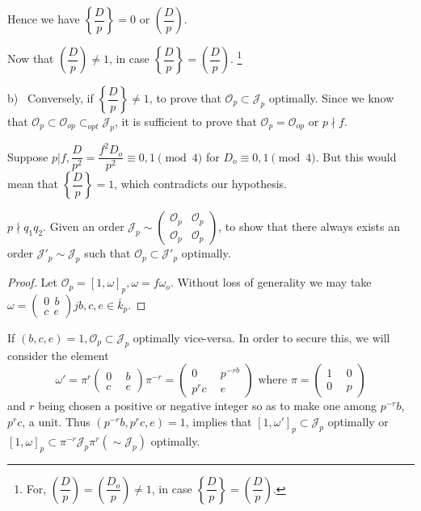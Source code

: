 Hence we have $\left\{\dfrac{D}{p}\right\} = 0$ or
$\left(\dfrac{D}{p}\right)$. 

Now that $\left(\dfrac{D}{p}\right) \neq 1$, in case
$\left\{\dfrac{D}{p}\right\} = \left(\dfrac{D}{p}\right)$. \footnote{For,
  $\left(\dfrac{D}{p}\right) = \left(\dfrac{D_o}{p}\right) \neq 1$, in case
  $\left\{\dfrac{D}{p}\right\} = \left(\dfrac{D}{p}\right)$.} 

b)~ Conversely, if $\left\{\dfrac{D}{p}\right\} \neq 1$, to prove that
$\mathscr{O}_p \subset \mathcal{J}_p$ optimally. Since we know that
$\mathscr{O}_p \subset \mathscr{O}_{op} \subset_{opt} \mathcal{J}_p$, it
is sufficient to prove that $\mathscr{O}_p = \mathscr{O}_{op}$ or $p
\nmid f$. 

Suppose $p | f, \dfrac{D}{p^2} = \dfrac{f^2 D_o}{p^2} \equiv 0, 1
\pmod 4$ for $D_o \equiv 0, 1 \pmod 4$. But this would mean that
$\left\{\dfrac{D}{p}\right\} = 1$, which contradicts our hypothesis. 

\begin{case}[(ii) ]\label{chap4:sec9:thm3:case2}%
  $p \nmid q_1 q_2$. Given an order $\mathcal{J}_p
  \sim \begin{pmatrix}  \mathscr{O}_p& \mathscr{O}_p\\ \mathscr{O}_p &
    \mathscr{O}_p \end{pmatrix}$, to show that there always exists an
  order $\mathcal{J}'_p \sim \mathcal{J}_p$ such that $\mathscr{O}_p
  \subset \mathcal{J}'_p$ optimally. 
\end{case} 

\begin{proof}
  Let $\mathscr{O}_p = [1, \omega]_p, \omega = f \omega_o$. Without
  loss of generality we may take $\omega = \begin{pmatrix}
    0~~b\\c~~e \end{pmatrix} jb, c, e \in \bar{k}_p$. 
\end{proof}

If $(b, c, e) = 1, \mathscr{O}_p \subset \mathcal{J}_p$ optimally
vice-versa. In order to secure this, we will consider the element 
$$
\omega' = \pi^r \begin{pmatrix} 0~&~b\\c~&~e \end{pmatrix}  \pi^{-r}
= \begin{pmatrix} 0~&~p^{-rb}\\p^rc~&~e \end{pmatrix} \text{ where }
\pi = \begin{pmatrix} 1~&~0\\0~&~p \end{pmatrix} 
$$
and $r$ being chosen a positive or negative integer so as to make one
among $p^{-r} b$, $p^r c$, a unit. Thus $(p^{-r}b, p^rc, e) = 1$, implies
that $[1, \omega']_p \subset \mathcal{J}_p$ optimally or $[1,
  \omega]_p \subset \pi^{-r} \mathcal{J}_p \pi^r (\sim \mathcal{J}_p)$
optimally. 

